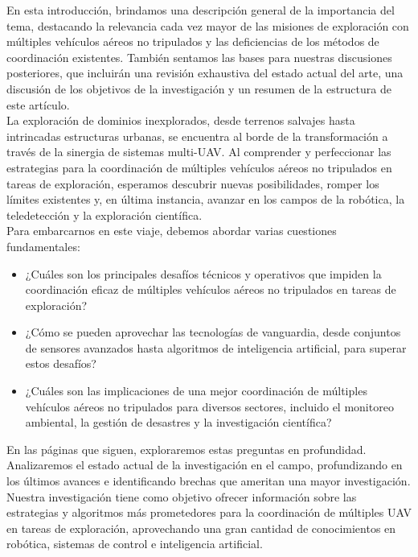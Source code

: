 \documentclass[sigconf]{acmart}
\begin{document}
En esta introducción, brindamos una descripción general de la importancia del tema, destacando la relevancia cada vez mayor de las misiones de exploración con múltiples vehículos aéreos no tripulados y las deficiencias de los métodos de coordinación existentes. También sentamos las bases para nuestras discusiones posteriores, que incluirán una revisión exhaustiva del estado actual del arte, una discusión de los objetivos de la investigación y un resumen de la estructura de este artículo.\\

La exploración de dominios inexplorados, desde terrenos salvajes hasta intrincadas estructuras urbanas, se encuentra al borde de la transformación a través de la sinergia de sistemas multi-UAV. Al comprender y perfeccionar las estrategias para la coordinación de múltiples vehículos aéreos no tripulados en tareas de exploración, esperamos descubrir nuevas posibilidades, romper los límites existentes y, en última instancia, avanzar en los campos de la robótica, la teledetección y la exploración científica.\\

Para embarcarnos en este viaje, debemos abordar varias cuestiones fundamentales:

\begin{itemize}
  \item ¿Cuáles son los principales desafíos técnicos y operativos que impiden la coordinación eficaz de múltiples vehículos aéreos no tripulados en tareas de exploración?
  \item ¿Cómo se pueden aprovechar las tecnologías de vanguardia, desde conjuntos de sensores avanzados hasta algoritmos de inteligencia artificial, para superar estos desafíos?
  \item ¿Cuáles son las implicaciones de una mejor coordinación de múltiples vehículos aéreos no tripulados para diversos sectores, incluido el monitoreo ambiental, la gestión de desastres y la investigación científica?
\end{itemize}

En las páginas que siguen, exploraremos estas preguntas en profundidad. Analizaremos el estado actual de la investigación en el campo, profundizando en los últimos avances e identificando brechas que ameritan una mayor investigación. Nuestra investigación tiene como objetivo ofrecer información sobre las estrategias y algoritmos más prometedores para la coordinación de múltiples UAV en tareas de exploración, aprovechando una gran cantidad de conocimientos en robótica, sistemas de control e inteligencia artificial.\\
\end{document}
